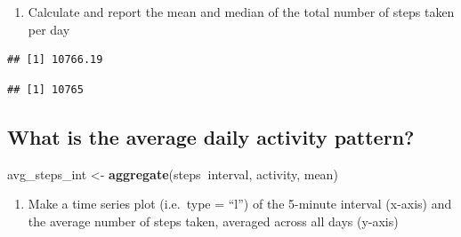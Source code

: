 \documentclass[]{article}
\newenvironment{Shaded}{\begin{snugshade}}{\end{snugshade}}
\newcommand{\KeywordTok}[1]{\textcolor[rgb]{0.13,0.29,0.53}{\textbf{#1}}}
\newcommand{\StringTok}[1]{\textcolor[rgb]{0.31,0.60,0.02}{#1}}
\newcommand{\OperatorTok}[1]{\textcolor[rgb]{0.81,0.36,0.00}{\textbf{#1}}}
\newcommand{\NormalTok}[1]{#1}
\providecommand{\tightlist}{%
  \setlength{\itemsep}{0pt}\setlength{\parskip}{0pt}}
\begin{document}
\begin{enumerate}
\def\labelenumi{\arabic{enumi}.}
\setcounter{enumi}{2}
\tightlist
\item
  Calculate and report the mean and median of the total number of steps
  taken per day
\end{enumerate}

\begin{Shaded}
\end{Shaded}

\begin{verbatim}
## [1] 10766.19
\end{verbatim}

\begin{Shaded}
\end{Shaded}

\begin{verbatim}
## [1] 10765
\end{verbatim}

\subsection{What is the average daily activity
pattern?}\label{what-is-the-average-daily-activity-pattern}

\begin{Shaded}
\begin{Highlighting}[]
\NormalTok{avg_steps_int <-}\StringTok{ }\KeywordTok{aggregate}\NormalTok{(steps}\OperatorTok{~}\NormalTok{interval, activity, mean)}
\end{Highlighting}
\end{Shaded}

\begin{enumerate}
\def\labelenumi{\arabic{enumi}.}
\tightlist
\item
  Make a time series plot (i.e.~type = ``l'') of the 5-minute interval
  (x-axis) and the average number of steps taken, averaged across all
  days (y-axis)
\end{enumerate}
\end{document}

